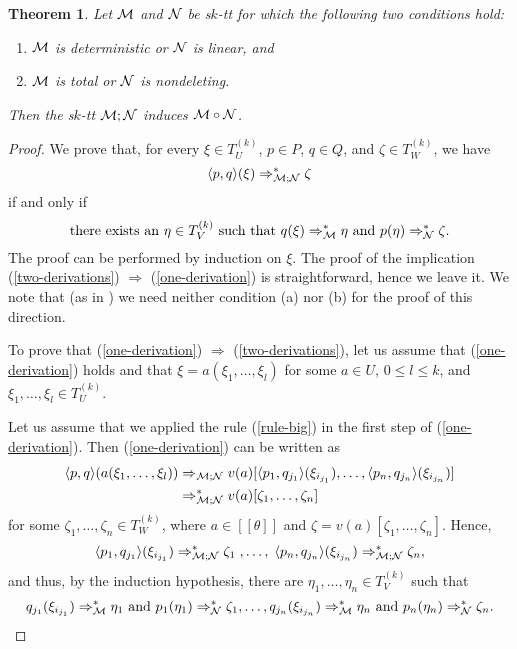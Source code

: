 \documentclass[10pt]{scrartcl}
\newtheorem{theo}[df]{Theorem}
\newcommand{\seml}{[\![}
\newcommand{\semr}{]\!]}
\newcommand{\M}{{\cal M}}
\newcommand{\N}{{\cal N}}
\def\ui#1{^{(#1)}}
\begin{document}
\begin{theo} \label{comp-lemma} Let $\M$ and $\N$ be s$k$-tt for which the following two conditions hold:
\begin{enumerate}
\item[(a)]  $\M$ is deterministic or $\N$ is linear, and
\item[(b)] $\M$ is total or $\N$ is  nondeleting.
\end{enumerate}
Then the s$k$-tt $\M ; \N$ induces $\M\circ \N$.
\end{theo}
\begin{proof} We prove that, for every $\xi \in T_U\ui k$, $p\in P$, $q\in Q$, and $\zeta \in T_W\ui k$, we have
\begin{equation}\label{one-derivation}
\langle p,q\rangle (\xi) \Rightarrow^*_{\M;\N} \zeta
\end{equation}
if and only if 
\begin{equation}\label{two-derivations}
\text{there exists an } \eta \in T_V\ui k \text{ such that }
q(\xi) \Rightarrow^*_{\M} \eta \text{ and } p(\eta) \Rightarrow^*_{\N} \zeta.
\end{equation}
The proof can be performed by induction on $\xi$. The proof of the
implication (\ref{two-derivations}) $\Rightarrow$
(\ref{one-derivation}) is straightforward, hence we leave it. We note
that (as in \cite[Thm.1]{bak79}) we need neither condition (a) nor (b) for the proof of this direction.

To prove  that (\ref{one-derivation}) $\Rightarrow$ (\ref{two-derivations}),
let us assume that (\ref{one-derivation}) holds and that $\xi=a(\xi_1,\ldots,\xi_l)$ for some $a\in U$, $0\le l \le k$, and $\xi_1,\ldots,\xi_l\in T_U\ui k$.

Let us assume that we applied the rule (\ref{rule-big}) in the first step of (\ref{one-derivation}).
Then  (\ref{one-derivation}) can be written as
\begin{align*}
\langle p,q\rangle (a(\xi_1,\ldots,\xi_l)) & \Rightarrow_{\M;\N} v(a)[\langle p_1, q_{j_1}\rangle (\xi_{i_{j_1}}),\ldots,\langle p_n, q_{j_n}\rangle (\xi_{i_{j_n}})] \\
    &   \Rightarrow^*_{\M;\N} v(a)[\zeta_1,\ldots,\zeta_n]
\end{align*}
for some $\zeta_1,\ldots,\zeta_n\in T_W\ui k$, where $a\in \seml\theta\semr$ and $\zeta=v(a)[\zeta_1,\ldots,\zeta_n]$. Hence,
\[
\langle p_1, q_{j_1}\rangle (\xi_{i_{j_1}}) \Rightarrow^*_{\M;\N}
\zeta_1 \; ,\ldots, \;
\langle p_n, q_{j_n}\rangle (\xi_{i_{j_n}}) \Rightarrow^*_{\M;\N} \zeta_n,
\]
and thus, by the induction hypothesis, there are $\eta_1,\ldots,\eta_n \in T_V\ui k$ such that
\begin{equation}\label{ind-hypothesis}
q_{j_1}(\xi_{i_{j_1}}) \Rightarrow^*_{\M} \eta_1 \text{ and } p_1(\eta_1) \Rightarrow^*_{\N}\zeta_1,\ldots,
q_{j_n}(\xi_{i_{j_n}}) \Rightarrow^*_{\M} \eta_n \text{ and } p_n(\eta_n) \Rightarrow^*_{\N}\zeta_n.
\end{equation}



\end{proof}
\end{document}
